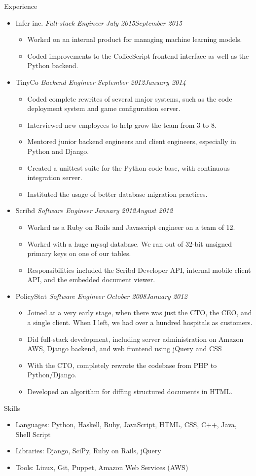 \documentclass[11pt,oneside]{article}
\newenvironment{ressection}[1]{
    \textrm{\Large#1}
    \begin{itemize}
}{
    \end{itemize}
}
\newcommand{\resitem}[1]{
    \item \begin{flushleft} \textsf{#1} \end{flushleft}
}
\newcommand{\ressubitem}[1]{
    \item \begin{flushleft} \textsf{#1} \end{flushleft}
}
\newcommand{\resbigitem}[3]{
    \item
    \textrm{#1}
    \hspace{5pt}
    \textit{#2}
    \hfill
    \textit{#3}
}
\newenvironment{ressubsec}[3]{
    \resbigitem{#1}{#2}{#3}
    \begin{itemize}
}{
    \end{itemize}
}
\begin{document}
\begin{ressection}{Experience}

    \begin{ressubsec}{Infer inc.}{Full-stack Engineer}{July 2015\textendash September 2015}
        \ressubitem{Worked on an internal product for managing machine learning models.}
        \ressubitem{Coded improvements to the CoffeeScript frontend interface as well as the Python backend.}
    \end{ressubsec}

    \begin{ressubsec}{TinyCo}{Backend Engineer}{September 2012\textendash January 2014}
        \ressubitem{Coded complete rewrites of several major systems, such as the code deployment system and game configuration server.}
        \ressubitem{Interviewed new employees to help grow the team from 3 to 8.}
        \ressubitem{Mentored junior backend engineers and client engineers, especially in Python and Django.}
        \ressubitem{Created a unittest suite for the Python code base, with continuous integration server.}
        \ressubitem{Instituted the usage of better database migration practices.}
    \end{ressubsec}

    \begin{ressubsec}{Scribd}{Software Engineer}{January 2012\textendash August 2012}
        \ressubitem{Worked as a Ruby on Rails and Javascript engineer on a team of 12.}
        \ressubitem{Worked with a huge mysql database. We ran out of 32-bit unsigned primary keys on one of our tables.}
        \ressubitem{Responsibilities included the Scribd Developer API, internal mobile client API, and the embedded document viewer.}
    \end{ressubsec}

    \begin{ressubsec}{PolicyStat}{Software Engineer}{October 2008\textendash January 2012}
        \ressubitem{Joined at a very early stage, when there was just the CTO, the CEO, and a single client. When I left, we had over a hundred hospitals as customers.}
        \ressubitem{Did full-stack development, including server administration on Amazon AWS, Django backend, and web frontend using jQuery and CSS}
        \ressubitem{With the CTO, completely rewrote the codebase from PHP to Python/Django.}
        \ressubitem{Developed an algorithm for diffing structured documents in HTML.}
    \end{ressubsec}

\end{ressection}

\begin{ressection}{Skills}
    \resitem{
        \textrm{Languages:}
        Python,
        Haskell,
        Ruby,
        JavaScript,
        HTML,
        CSS,
        C++,
        Java,
        Shell Script
    }

    \resitem{
        \textrm{Libraries:}
        Django,
        SciPy,
        Ruby on Rails,
        jQuery
    }

    \resitem{
        \textrm{Tools:}
        Linux,
        Git,
        Puppet,
        Amazon Web Services (AWS)
    }
\end{ressection}
\end{document}
